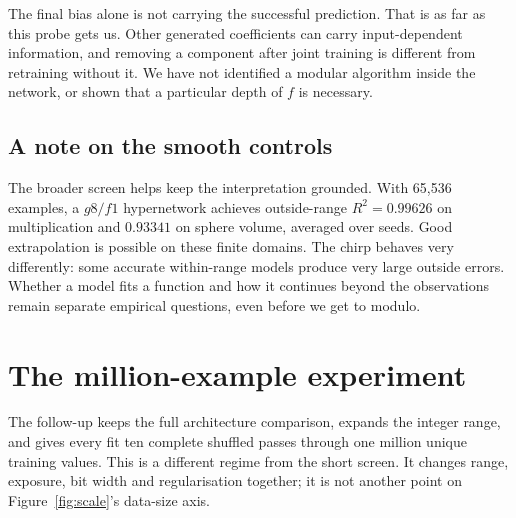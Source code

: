 \documentclass{article}
\begin{document}
The final bias alone is not carrying the successful prediction. That is as far as
this probe gets us. Other generated coefficients can carry input-dependent
information, and removing a component after joint training is different from
retraining without it. We have not identified a modular algorithm inside the
network, or shown that a particular depth of $f$ is necessary.

\subsection{A note on the smooth controls}
The broader screen helps keep the interpretation grounded. With 65,536 examples,
a $g8/f1$ hypernetwork achieves outside-range $R^2=0.99626$ on multiplication and
$0.93341$ on sphere volume, averaged over seeds. Good extrapolation is possible
on these finite domains. The chirp behaves very differently: some accurate
within-range models produce very large outside errors. Whether a model fits a
function and how it continues beyond the observations remain separate empirical
questions, even before we get to modulo.

\newpage
\section{The million-example experiment}
The follow-up keeps the full architecture comparison, expands the integer range,
and gives every fit ten complete shuffled passes through one million unique
training values. This is a different regime from the short screen. It changes
range, exposure, bit width and regularisation together; it is not another point
on Figure~\ref{fig:scale}'s data-size axis.
\end{document}
